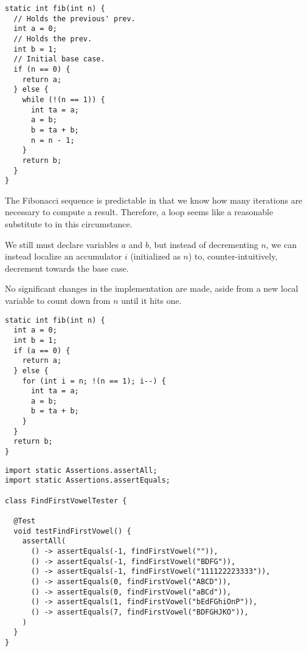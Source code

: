 \begin{lstlisting}[language=MyJava]
static int fib(int n) {
  // Holds the previous' prev.
  int a = 0;
  // Holds the prev.
  int b = 1;
  // Initial base case.
  if (n == 0) {
    return a;
  } else {
    while (!(n == 1)) {
      int ta = a;
      a = b;
      b = ta + b;
      n = n - 1;
    }
    return b;
  }
}
\end{lstlisting}

The Fibonacci sequence is predictable in that we know how many iterations are necessary to compute a result. Therefore, a  loop seems like a reasonable substitute to  in this circumstance. 

We still must declare variables $a$ and $b$, but instead of decrementing $n$, we can instead localize an accumulator $i$ (initialized as $n$) to, counter-intuitively, decrement towards the base case. 

No significant changes in the implementation are made, aside from a new local variable to count down from $n$ until it hits one.

\begin{lstlisting}[language=MyJava]
static int fib(int n) {
  int a = 0;
  int b = 1;
  if (a == 0) {
    return a;
  } else {
    for (int i = n; !(n == 1); i--) {
      int ta = a;
      a = b;
      b = ta + b;
    }
  }
  return b;
}
\end{lstlisting}


\begin{lstlisting}[language=MyJava]
import static Assertions.assertAll;
import static Assertions.assertEquals;

class FindFirstVowelTester {

  @Test
  void testFindFirstVowel() {
    assertAll(
      () -> assertEquals(-1, findFirstVowel("")),
      () -> assertEquals(-1, findFirstVowel("BDFG")),
      () -> assertEquals(-1, findFirstVowel("111122223333")),
      () -> assertEquals(0, findFirstVowel("ABCD")),
      () -> assertEquals(0, findFirstVowel("aBCd")),
      () -> assertEquals(1, findFirstVowel("bEdFGhiOnP")),
      () -> assertEquals(7, findFirstVowel("BDFGHJKO")),
    )
  }
}
\end{lstlisting}

